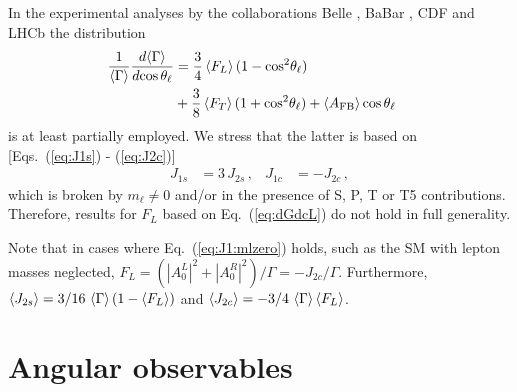 In the experimental analyses by the collaborations
Belle \cite{:2009zv}, BaBar \cite{:2012vwa}, CDF \cite{BKll:CDF:ICHEP:2012}
and LHCb \cite{ Aaij:2011aa} 
the distribution
\begin{align}
  \label{eq:dGdcL}
  \frac{1}{\braket{\Gamma}} \frac{d\!\braket{\Gamma}}{d\!\cos{\theta_\ell}} & = 
      \frac{3}{4} \braket{F_L} (1 - \cos^2\!{\theta_\ell})  
\\ \nonumber
&   + \frac{3}{8} \braket{F_T} (1 + \cos^2\!{\theta_\ell}) 
   + \braket{A_{\rm FB}} \cos{\theta_\ell} \, &
\end{align}
is at least partially  employed.
We stress that the latter is based on 
[\cf Eqs.~(\ref{eq:J1s}) - (\ref{eq:J2c})]
\begin{align}
  \label{eq:J1:mlzero}
  J_{1s} & = 3\, J_{2s} \, , & 
  J_{1c} & = -J_{2c} \, ,
\end{align}
which is broken by $m_\ell \neq 0$ and/or in the presence of S, P, T or T5
contributions. Therefore, results for $F_L$  based on Eq.~(\ref{eq:dGdcL})
do not hold in full generality.

Note that in cases where Eq.~(\ref{eq:J1:mlzero}) holds, such as the SM with
lepton masses neglected, $F_L = (|A_0^L|^2 + |A_0^R|^2)/\Gamma= -
J_{2c}/\Gamma$. Furthermore, $\braket{J_{2s}} = 3/16\, \braket{\Gamma} (1 -
\braket{F_L})$ and $\braket{J_{2c}} = - 3/4\, \braket{\Gamma} \braket{F_L}$.

%
%
\section{Angular observables \label{sec:ang:obs}}

